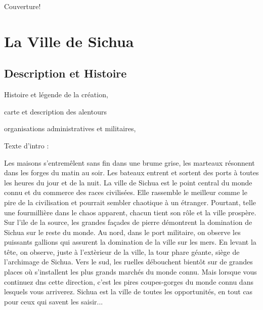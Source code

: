 \documentclass{dd}
\begin{document}
Couverture!

\clearpage

\tableofcontents

\part{La Ville de Sichua}

\chapter{Description et Histoire}

Histoire et légende de la création, 

carte et description des alentours

organisations administratives et militaires, 

Texte d'intro :

Les maisons s'entremêlent sans fin dans une brume grise, les marteaux résonnent
dans les forges du matin au soir. Les bateaux entrent et sortent 
des ports à toutes les heures du jour et de la nuit. La ville de Sichua est le point central 
du monde connu et du commerce des races civilisées. Elle rassemble le meilleur
comme le pire de la civilisation et pourrait sembler chaotique à un étranger.
Pourtant, telle une fourmillière dans le chaos apparent, chacun tient son rôle
et la ville prospère. Sur l'ile de la source, les grandes façades de pierre
démontrent la domination de Sichua sur le reste du monde. Au nord, dans le port 
militaire, on observe les puissants gallions qui assurent la domination de la ville 
sur les mers. En levant la tête, on observe, juste à l'extèrieur de la ville, la
tour phare géante, siège de l'archimage de Sichua. Vers le sud, les ruelles
débouchent bientôt sur de grandes places où s'installent les plus grands marchés 
du monde connu. Mais lorsque vous continuez dns cette direction, c'est les pires
coupes-gorges du monde connu dans lesquels vous arriverez. Sichua est la ville 
de toutes les opportunités, en tout cas pour ceux qui savent les saisir...
\end{document}
